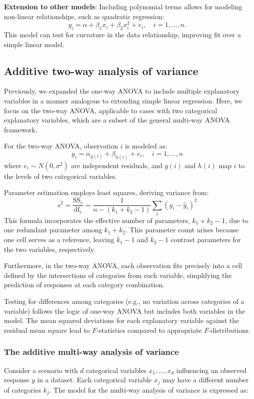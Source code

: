 \documentclass{article}
\begin{document}
\textbf{Extension to other models}: Including polynomial terms allows for modeling non-linear relationships, such as quadratic regression:
\[
y_i = \alpha + \beta_1 x_i + \beta_2 x_i^2 + e_i, \quad i = 1, \ldots, n.
\]
This model can test for curvature in the data relationship, improving fit over a simple linear model.


\subsection{Additive two-way analysis of variance}
Previously, we expanded the one-way ANOVA to include multiple explanatory variables in a manner analogous to extending simple linear regression. Here, we focus on the two-way ANOVA, applicable to cases with two categorical explanatory variables, which are a subset of the general multi-way ANOVA framework.

For the two-way ANOVA, observation $i$ is modeled as:
\begin{equation*}
y_{i}=\alpha_{g(i)}+\beta_{h(i)}+e_{i}, \quad i=1, \ldots, n
\end{equation*}
where $e_i \sim N(0, \sigma^2)$ are independent residuals, and $g(i)$ and $h(i)$ map $i$ to the levels of two categorical variables.

Parameter estimation employs least squares, deriving variance from:
\begin{equation*}
s^{2} =\frac{\mathrm{SS}_{e}}{\mathrm{df}_{e}}=\frac{1}{n-\left(k_{1}+k_{2}-1\right)} \sum_{i}\left(y_{i}-\hat{y}_{i}\right)^{2}
\end{equation*}
This formula incorporates the effective number of parameters, $k_{1}+k_{2}-1$, due to one redundant parameter among $k_{1}+k_{2}$. This parameter count arises because one cell serves as a reference, leaving $k_{1}-1$ and $k_{2}-1$ contrast parameters for the two variables, respectively.

Furthermore, in the two-way ANOVA, each observation fits precisely into a cell defined by the intersections of categories from each variable, simplifying the prediction of responses at each category combination.

Testing for differences among categories (e.g., no variation across categories of a variable) follows the logic of one-way ANOVA but includes both variables in the model. The mean squared deviations for each explanatory variable against the residual mean square lead to $F$-statistics compared to appropriate $F$-distributions.

\subsubsection{The additive multi-way analysis of variance}
Consider a scenario with $d$ categorical variables $x_{1}, \ldots, x_{d}$ influencing an observed response $y$ in a dataset. Each categorical variable $x_j$ may have a different number of categories $k_j$. The model for the multi-way analysis of variance is expressed as:
\end{document}
